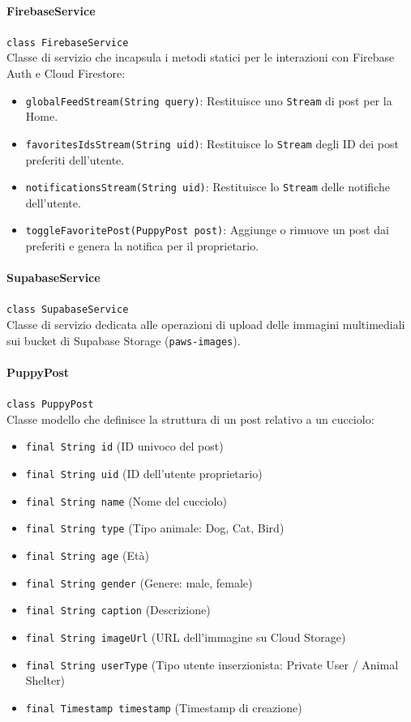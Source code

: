 \documentclass[a4paper]{report}
\begin{document}

\paragraph{FirebaseService}
\texttt{class FirebaseService} \\
Classe di servizio che incapsula i metodi statici per le interazioni con Firebase Auth e Cloud Firestore:
\begin{itemize}
    \item \texttt{globalFeedStream(String query)}: Restituisce uno \texttt{Stream} di post per la Home.
    \item \texttt{favoritesIdsStream(String uid)}: Restituisce lo \texttt{Stream} degli ID dei post preferiti dell'utente.
    \item \texttt{notificationsStream(String uid)}: Restituisce lo \texttt{Stream} delle notifiche dell'utente.
    \item \texttt{toggleFavoritePost(PuppyPost post)}: Aggiunge o rimuove un post dai preferiti e genera la notifica per il proprietario.
\end{itemize}

\paragraph{SupabaseService}
\texttt{class SupabaseService} \\
Classe di servizio dedicata alle operazioni di upload delle immagini multimediali sui bucket di Supabase Storage (\texttt{paws-images}).


\paragraph{PuppyPost}
\texttt{class PuppyPost} \\
Classe modello che definisce la struttura di un post relativo a un cucciolo:
\begin{itemize}
    \item \texttt{final String id} (ID univoco del post)
    \item \texttt{final String uid} (ID dell'utente proprietario)
    \item \texttt{final String name} (Nome del cucciolo)
    \item \texttt{final String type} (Tipo animale: Dog, Cat, Bird)
    \item \texttt{final String age} (Età)
    \item \texttt{final String gender} (Genere: male, female)
    \item \texttt{final String caption} (Descrizione)
    \item \texttt{final String imageUrl} (URL dell'immagine su Cloud Storage)
    \item \texttt{final String userType} (Tipo utente inserzionista: Private User / Animal Shelter)
    \item \texttt{final Timestamp timestamp} (Timestamp di creazione)
\end{itemize}
\end{document}
